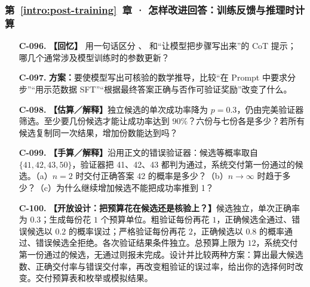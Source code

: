 \subsubsection*{第~\ref*{intro:post-training}~章 · 怎样改进回答：训练反馈与推理时计算}
\begin{enumerate}[label={},leftmargin=4.8em,itemsep=4pt]
\item[\textbf{C-096.}] \leavevmode{}\label{exercise:C-096}\label{exercise:reference-policy-role}\textbf{【回忆】} 用一句话区分 、 和“让模型把步骤写出来”的 CoT 提示；
哪几个通常涉及模型训练时的参数更新？
\item[\textbf{C-097.}] \leavevmode{}\label{exercise:C-097}\label{exercise:reasoning-interventions}\textbf{方案：}要使模型写出可核验的数学推导，比较“在 Prompt 中要求分步”“用示范数据 SFT”“根据最终答案正确与否作可验证奖励”改变了什么。
\item[\textbf{C-098.}] \leavevmode{}\label{exercise:C-098}\label{exercise:candidate-success-budget}\textbf{【估算／解释】}独立候选的单次成功率降为 $p=0.3$，仍由完美验证器筛选。至少要几份候选才能让成功率达到 $90\%$？六份与七份各是多少？若所有候选复制同一次结果，增加份数能达到吗？
\item[\textbf{C-099.}] \leavevmode{}\label{exercise:C-099}\label{exercise:faulty-verifier-limit}\textbf{【手算／解释】}沿用正文的错误验证器：候选等概率取自 $\{41,42,43,50\}$，验证器把 41、42、43 都判为通过，系统交付第一份通过的候选。（a）$n=2$ 时交付正确答案 42 的概率是多少？（b）$n\to\infty$ 时趋于多少？（c）为什么继续增加候选不能把成功率推到 1？
\item[\textbf{C-100.}] \leavevmode{}\label{exercise:C-100}\label{exercise:verifier-budget-design}\textbf{【开放设计：把预算花在候选还是核验上？】}候选独立，单次正确率为 $0.3$；生成每份花 $1$ 个预算单位。粗验证每份再花 $1$，正确候选全通过、错误候选以 $0.2$ 的概率误过；严格验证每份再花 $2$，正确候选以 $0.8$ 的概率通过、错误候选全拒绝。各次验证结果条件独立。总预算上限为 $12$，系统交付第一份通过的候选，无通过则报未完成。设计并比较两种方案：算出最大候选数、正确交付率与错误交付率，再改变粗验证的误过率，给出你的选择何时改变。交付预算表和枚举或模拟结果。

\end{enumerate}
